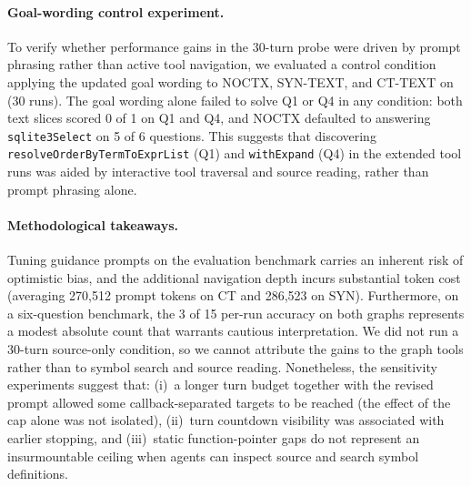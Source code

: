 \paragraph{Goal-wording control experiment.}
To verify whether performance gains in the 30-turn probe were driven by prompt phrasing
rather than active tool navigation, we evaluated a control condition applying the updated
goal wording to \textsc{NOCTX}, \textsc{SYN-TEXT}, and \textsc{CT-TEXT} on \qwen (30 runs).
The goal wording alone failed to solve Q1 or Q4 in any condition: both text slices scored
0 of 1 on Q1 and Q4, and \textsc{NOCTX} defaulted to answering \texttt{sqlite3Select} on 5 of 6
questions.
This suggests that discovering \texttt{resolveOrderByTermToExprList} (Q1) and \texttt{withExpand}
(Q4) in the extended tool runs was aided by interactive tool traversal and source reading,
rather than prompt phrasing alone.

\paragraph{Methodological takeaways.}
Tuning guidance prompts on the evaluation benchmark carries an inherent risk of
optimistic bias, and the additional navigation depth incurs substantial token cost
(averaging 270{,}512 prompt tokens on CT and 286{,}523 on SYN).
Furthermore, on a six-question benchmark, the 3 of 15 per-run accuracy on both graphs represents
a modest absolute count that warrants cautious interpretation.
We did not run a 30-turn source-only condition, so we cannot attribute the gains to the
graph tools rather than to symbol search and source reading.
Nonetheless, the sensitivity experiments suggest that: (i)~a longer turn budget together with the
revised prompt allowed some callback-separated targets to be reached (the effect of the cap alone
was not isolated), (ii)~turn countdown visibility was associated with earlier stopping, and
(iii)~static function-pointer gaps do not represent an insurmountable ceiling when agents can
inspect source and search symbol definitions.
